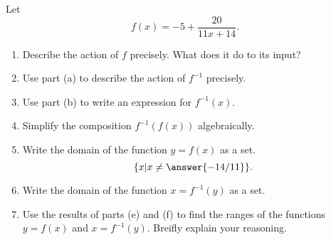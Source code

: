 \documentclass{ximera}
\begin{document}
\begin{question}   \label{Q467745545}
Let 
\[
      f(x) = -5 + \frac{20}{11x + 14} .
\]
\begin{enumerate}
\item Describe the action of $f$ precisely. What does it do to its input?

\item Use part (a) to describe the action of $f^{-1}$ precisely.

\item Use part (b) to write an expression for $f^{-1}(x)$.

\item Simplify the composition $f^{-1}(f(x))$ algebraically.

\item Write the domain of the function $y=f(x)$ as a set.
\[
    \{ x | x \neq \answer{-14/11} \}.
\]

\item Write the domain of the function $x=f^{-1}(y)$ as a set.

\item Use the results of parts (e) and (f) to find the ranges of the functions $y=f(x)$ and $x = f^{-1}(y)$. Breifly explain your reasoning.



\end{enumerate}

\end{question}
\end{document}
